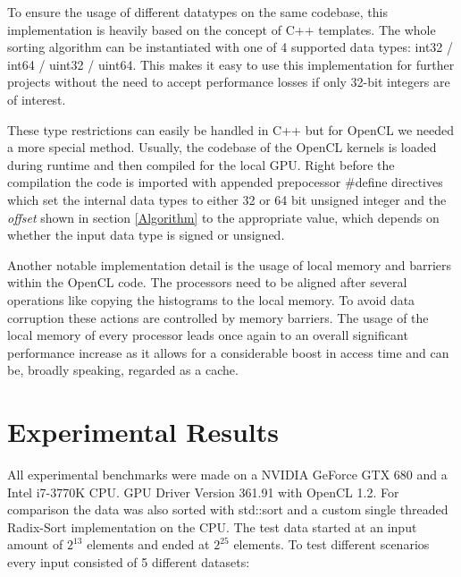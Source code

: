 \documentclass{llncs}
\begin{document}
To ensure the usage of different datatypes on the same codebase, this implementation is heavily based on the concept of C++ templates. The whole sorting algorithm can be instantiated with one of 4 supported data types: int32 / int64 / uint32 / uint64. This makes it easy to use this implementation for further projects without the need to accept performance losses if only 32-bit integers are of interest.

These type restrictions can easily be handled in C++ but for OpenCL we needed a more special method. Usually, the codebase of the OpenCL kernels is loaded during runtime and then compiled for the local GPU. Right before the compilation the code is imported with appended prepocessor \#define directives which set the internal data types to either 32 or 64 bit unsigned integer and the \textit{offset} shown in section \ref{Algorithm} to the appropriate value, which depends on whether the input data type is signed or unsigned.

Another notable implementation detail is the usage of local memory and barriers within the OpenCL code. The processors need to be aligned after several operations like copying the histograms to the local memory. To avoid data corruption these actions are controlled by memory barriers. The usage of the local memory of every processor leads once again to an overall significant performance increase as it allows for a considerable boost in access time and can be, broadly speaking, regarded as a cache.

\newpage
\section{Experimental Results}
All experimental benchmarks were made on a NVIDIA GeForce GTX 680 and a Intel i7-3770K CPU. GPU Driver Version 361.91 with OpenCL 1.2. For comparison the data was also sorted with std::sort and a custom single threaded Radix-Sort implementation on the CPU. The test data started at an input amount of $2^{13}$ elements and ended at $2^{25}$ elements. To test different scenarios every input consisted  of 5 different datasets:
\end{document}
